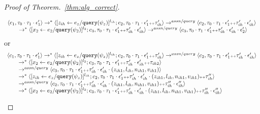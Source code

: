 \begin{proof}[Proof of Theorem.~\ref{thm:alg_correct}]
\begin{case}
\begin{subcase}
\begin{equation}
\begin{array}{l}
  \langle c_1, \mathtt{\tau}_0 \cdot \mathtt{\tau}_1 \cdot \mathtt{\epsilon}_1' \rangle 
  \rightarrow^{*} 
  \langle [\mathrel{ z_{ih} \leftarrow e_z / {\tt query}(\psi_z) }]^{l_{ih}};{c}_2, 
  \mathtt{\tau}_0 \cdot \mathtt{\tau}_1 \cdot \mathtt{\epsilon}_1' {\scriptscriptstyle ++} \mathtt{\tau}_{ih}' \rangle 
  \rightarrow^{assn/query} 
  \langle {c}_2,  \mathtt{\tau}_0 \cdot \mathtt{\tau}_1 \cdot \mathtt{\epsilon}_1'  {\scriptscriptstyle ++} \mathtt{\tau}_{ih}' \cdot \mathtt{\epsilon}_{ih}' \rangle  \\
  \qquad \rightarrow^{*} 
  \langle [\mathrel{ {x}_2 \leftarrow e_2 / {\tt query}(\psi_2) }]^{l_2};{c}_3, 
  \mathtt{\tau}_0 \cdot \mathtt{\tau}_1 \cdot \mathtt{\epsilon}_1'  {\scriptscriptstyle ++} \mathtt{\tau}_{ih}' \cdot \mathtt{\epsilon}_{ih}' \rangle 
  \rightarrow^{assn/query} 
  \langle {c}_3,  \mathtt{\tau}_0 \cdot \mathtt{\tau}_1 \cdot \mathtt{\epsilon}_1'  {\scriptscriptstyle ++} \mathtt{\tau}_{ih}' \cdot \mathtt{\epsilon}_{ih}' \cdot \mathtt{\epsilon}_2' \rangle 
\end{array}
 \end{equation}
 or 
\[
  \begin{array}{l}   
  \langle c_1, \mathtt{\tau}_0 \cdot \mathtt{\tau}_1 \cdot \mathtt{\epsilon}_1' \rangle 
  \rightarrow^{*} 
  \langle [\mathrel{ z_{ih} \leftarrow e_z / {\tt query}(\psi_z) }]^{l_{ih}};{c}_2, 
  \mathtt{\tau}_0 \cdot \mathtt{\tau}_1 \cdot \mathtt{\epsilon}_1' {\scriptscriptstyle ++} \mathtt{\tau}_{ih}' \rangle 
  \rightarrow^{assn/query} 
  \langle {c}_2,  \mathtt{\tau}_0 \cdot \mathtt{\tau}_1 \cdot \mathtt{\epsilon}_1'  {\scriptscriptstyle ++} \mathtt{\tau}_{ih}' \cdot \mathtt{\epsilon}_{ih}' \rangle  \\
  \qquad \rightarrow^{*} 
  \langle [\mathrel{ {x}_2 \leftarrow e_2 / {\tt query}(\psi_2) }]^{l_2};{c}_3, 
  \mathtt{\tau}_0 \cdot \mathtt{\tau}_1 \cdot \mathtt{\epsilon}_1'  {\scriptscriptstyle ++} \mathtt{\tau}_{ih}' \cdot \mathtt{\epsilon}_{ih}' {\scriptscriptstyle ++} \mathtt{\tau}_{ih2} \rangle 
  \\ \qquad
  \rightarrow^{assn/query} 
  \langle {c}_3,  \mathtt{\tau}_0 \cdot \mathtt{\tau}_1 \cdot \mathtt{\epsilon}_1'  {\scriptscriptstyle ++} \mathtt{\tau}_{ih}' \cdot \mathtt{\epsilon}_{ih}' \cdot (z_{ih1}, l_{ih}, n_{ih1}, v_{ih1}) \rangle 
  \\ \qquad
  \rightarrow^{*} 
  \langle [\mathrel{ z_{ih} \leftarrow e_z / {\tt query}(\psi_z) }]^{l_{ih}};{c}_2, 
  \mathtt{\tau}_0 \cdot \mathtt{\tau}_1 \cdot \mathtt{\epsilon}_1' {\scriptscriptstyle ++} \mathtt{\tau}_{ih}' \cdot \mathtt{\epsilon}_{ih}' \cdot (z_{ih1}, l_{ih}, n_{ih1}, v_{ih1}) {\scriptscriptstyle ++} \mathtt{\tau}_{ih}'' \rangle 
  \\ \qquad
  \rightarrow^{assn/query} 
  \langle {c}_2,  \mathtt{\tau}_0 \cdot \mathtt{\tau}_1 \cdot \mathtt{\epsilon}_1'  {\scriptscriptstyle ++} \mathtt{\tau}_{ih}' \cdot \mathtt{\epsilon}_{ih}' \cdot (z_{ih1}, l_{ih}, n_{ih1}, v_{ih1}) {\scriptscriptstyle ++} \mathtt{\tau}_{ih}'' \cdot \mathtt{\epsilon}_{ih}'' \rangle  
  \\
  \qquad \rightarrow^{*} 
  \langle [\mathrel{ {x}_2 \leftarrow e_2 / {\tt query}(\psi_2) }]^{l_2};{c}_3, 
  \mathtt{\tau}_0 \cdot \mathtt{\tau}_1 \cdot \mathtt{\epsilon}_1'  {\scriptscriptstyle ++} \mathtt{\tau}_{ih}' \cdot \mathtt{\epsilon}_{ih}' \cdot (z_{ih1}, l_{ih}, n_{ih1}, v_{ih1}) {\scriptscriptstyle ++} \mathtt{\tau}_{ih}'' \cdot \mathtt{\epsilon}_{ih}'' \rangle 

\end{array}\]
\end{subcase}
\end{case}
\end{proof}
